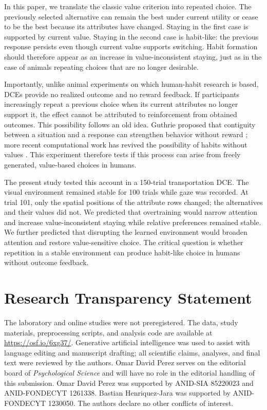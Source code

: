 \documentclass[man,natbib,floatsintext]{apa7}
\begin{document}
In this paper, we translate the classic value criterion into repeated choice. The previously selected alternative can remain the best under current utility or cease to be the best because its attributes have changed. Staying in the first case is supported by current value. Staying in the second case is habit-like: the previous response persists even though current value supports switching. Habit formation should therefore appear as an increase in value-inconsistent staying, just as in the case of animals repeating choices that are no longer desirable.

Importantly, unlike animal experiments on which human-habit research is based, DCEs provide no realized outcome and no reward feedback. If participants increasingly repeat a previous choice when its current attributes no longer support it, the effect cannot be attributed to reinforcement from obtained outcomes. This possibility follows an old idea. Guthrie proposed that contiguity between a situation and a response can strengthen behavior without reward \citep{guthrie1935}; more recent computational work has revived the possibility of habits without values \citep{millerHabits2019}. This experiment therefore tests if this process can arise from freely generated, value-based choices in humans.

The present study tested this account in a 150-trial transportation DCE. The visual environment remained stable for 100 trials while gaze was recorded. At trial 101, only the spatial positions of the attribute rows changed; the alternatives and their values did not. We predicted that overtraining would narrow attention and increase value-inconsistent staying while relative preferences remained stable. We further predicted that disrupting the learned environment would broaden attention and restore value-sensitive choice. The critical question is whether repetition in a stable environment can produce habit-like choice in humans without outcome feedback.

\section{Research Transparency Statement}

The laboratory and online studies were not preregistered. The data, study materials, preprocessing scripts, and analysis code are available at \url{https://osf.io/6xg37/}. Generative artificial intelligence was used to assist with language editing and manuscript drafting; all scientific claims, analyses, and final text were reviewed by the authors. Omar David Perez serves on the editorial board of \emph{Psychological Science} and will have no role in the editorial handling of this submission. Omar David Perez was supported by ANID-SIA 85220023 and ANID-FONDECYT 1261338. Bastian Henriquez-Jara was supported by ANID-FONDECYT 1230050. The authors declare no other conflicts of interest.
\end{document}
